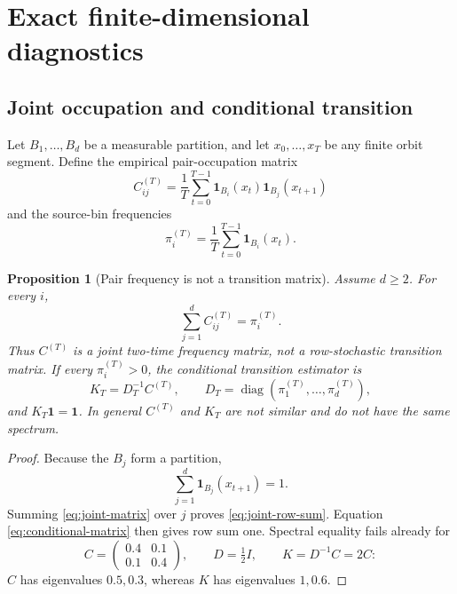 \documentclass[11pt]{article}
\newtheorem{proposition}[theorem]{Proposition}
\theoremstyle{definition}
\theoremstyle{remark}
\begin{document}
\section{Exact finite-dimensional diagnostics}\label{sec:algebraic}

\subsection{Joint occupation and conditional transition}

Let $B_1,\ldots,B_d$ be a measurable partition, and let $x_0,\ldots,x_T$ be any finite orbit segment.  Define the empirical pair-occupation matrix
\begin{equation}\label{eq:joint-matrix}
    C_{ij}^{(T)}
    =\frac1T\sum_{t=0}^{T-1}
      \mathbf 1_{B_i}(x_t)\mathbf 1_{B_j}(x_{t+1})
\end{equation}
and the source-bin frequencies
\begin{equation}\label{eq:source-frequencies}
    \pi_i^{(T)}=\frac1T\sum_{t=0}^{T-1}\mathbf 1_{B_i}(x_t).
\end{equation}

\begin{proposition}[Pair frequency is not a transition matrix]\label{prop:joint-transition}
Assume $d\ge2$.
For every $i$,
\begin{equation}\label{eq:joint-row-sum}
    \sum_{j=1}^d C_{ij}^{(T)}=\pi_i^{(T)}.
\end{equation}
Thus $C^{(T)}$ is a joint two-time frequency matrix, not a row-stochastic transition matrix.  If every $\pi_i^{(T)}>0$, the conditional transition estimator is
\begin{equation}\label{eq:conditional-matrix}
    K_T=D_T^{-1}C^{(T)},
    \qquad
    D_T=\operatorname{diag}(\pi_1^{(T)},\ldots,\pi_d^{(T)}),
\end{equation}
and $K_T\mathbf 1=\mathbf 1$.  In general $C^{(T)}$ and $K_T$ are not similar and do not have the same spectrum.
\end{proposition}

\begin{proof}
Because the $B_j$ form a partition,
\[
    \sum_{j=1}^d\mathbf 1_{B_j}(x_{t+1})=1.
\]
Summing \eqref{eq:joint-matrix} over $j$ proves \eqref{eq:joint-row-sum}.  Equation \eqref{eq:conditional-matrix} then gives row sum one.  Spectral equality fails already for
\[
    C=\begin{pmatrix}0.4&0.1\\0.1&0.4\end{pmatrix},
    \qquad D=\tfrac12 I,
    \qquad K=D^{-1}C=2C:
\]
$C$ has eigenvalues $0.5,0.3$, whereas $K$ has eigenvalues $1,0.6$.
\end{proof}
\end{document}
